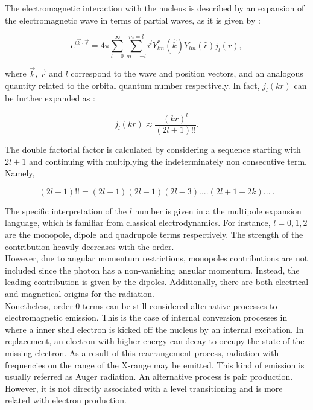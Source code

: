 \documentclass[openany]{book}
\begin{document}
The electromagnetic interaction with the nucleus is described by an expansion of the electromagnetic wave in terms of partial waves, as it is given by \cite{joachain_1975}: 

\begin{equation}\label{eq:nuclearTransitions_waveExpansion}
	e^{i\vec k \cdot \vec r} = 4 \pi \sum_{l = 0}^{\infty}  \sum_{m = -l}^{m=l} {i^l Y^{*}_{lm} (\hat k)  Y_{lm} (\hat r) j_l(r)}, 
\end{equation}

where $\vec k$, $\vec r$ and $l$ correspond to the wave and position vectors, and an analogous quantity related to the orbital quantum number respectively. In fact, $j_l(kr)$ can be further expanded as \cite{blatt_weisskopf_1952}: 

\begin{equation}\label{eq:nuclearTransitions_jlExpansion}
	j_l(kr) \approx \frac{(kr)^l}{(2l + 1)!!}.
\end{equation}

 The double factorial factor is calculated by considering a sequence starting with $2l +1$ and continuing with multiplying the indeterminately non consecutive term. Namely, 

\begin{equation}\label{eq:nuclearTransitions_doubleFactorial}
	(2l + 1)!! = (2l +1)(2l-1)(2l -3 ) .... (2l + 1 - 2k) ... \ .
\end{equation}

The specific interpretation of the $l$ number is given in a the multipole expansion language, which is familiar from classical electrodynamics.  For instance, $l = 0, 1, 2$ are the monopole, dipole and quadrupole terms respectively. The strength of the contribution heavily decreases with the order.  \\

However, due to angular momentum restrictions, monopoles contributions are not included since the photon has a non-vanishing angular momentum. Instead, the leading contribution is given by the dipoles. Additionally, there are both electrical and magnetical origins for the radiation.  \\

Nonetheless, order 0 terms can be still considered alternative processes to electromagnetic emission. This is the case of internal conversion processes in where a inner shell electron is kicked off the nucleus by an internal excitation. In replacement, an electron with higher energy can decay to occupy the state of the missing electron. As a result of this rearrangement process, radiation with frequencies on the range of the X-range may be emitted. This kind of emission is usually referred as Auger radiation. An alternative process is pair production. However, it is not directly associated with a level transitioning and is more related with electron production.  \\
\end{document}
